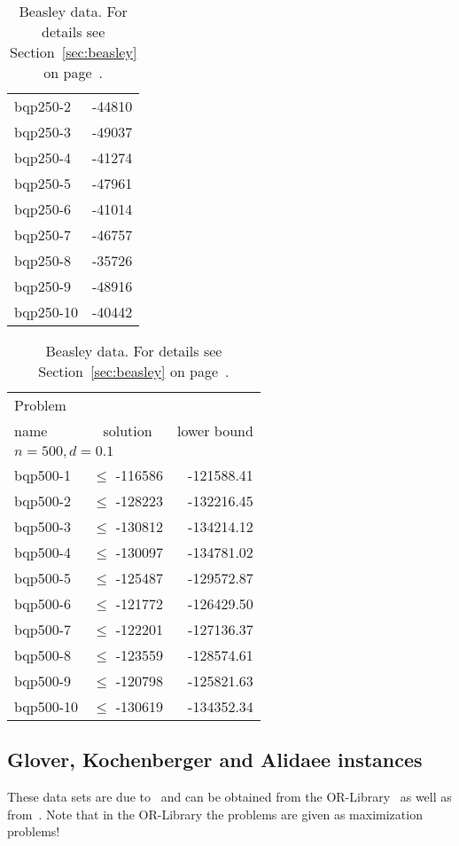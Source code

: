 \documentclass[a4paper, 12pt]{article}
\begin{document}
\begin{table}
\begin{center}
\begin{minipage}{38ex}
\begin{center}
\begin{tabular}{|l|r|}
bqp250-2  & -44810  \\
bqp250-3  & -49037  \\
bqp250-4  & -41274  \\
bqp250-5  & -47961  \\
bqp250-6  & -41014  \\
bqp250-7  & -46757  \\
bqp250-8  & -35726  \\
bqp250-9  & -48916  \\
bqp250-10 & -40442  \\
\hline
\end{tabular}
\end{center}

\begin{tabular}{|l|r|r|}
\hline
Problem& & \\
name &\multicolumn{1}{|c|}{solution}&\multicolumn{1}{|c|}{lower bound}\\
\hline
\multicolumn{3}{|l|}{$n=500, d=0.1$}\\
\hline
bqp500-1  & $\le$ -116586 & -121588.41 \\
bqp500-2  & $\le$ -128223 & -132216.45 \\
bqp500-3  & $\le$ -130812 & -134214.12 \\
bqp500-4  & $\le$ -130097 & -134781.02 \\
bqp500-5  & $\le$ -125487 & -129572.87 \\
bqp500-6  & $\le$ -121772 & -126429.50 \\
bqp500-7  & $\le$ -122201 & -127136.37 \\
bqp500-8  & $\le$ -123559 & -128574.61 \\
bqp500-9  & $\le$ -120798 & -125821.63 \\
bqp500-10 & $\le$ -130619 & -134352.34 \\
\hline
\end{tabular}
\end{minipage}
\caption{Beasley data. For details see Section~\ref{sec:beasley} on
  page~\pageref{sec:beasley}.} \label{tab:beasley} 
\end{center} 
\end{table}



\subsection{Glover, Kochenberger and Alidaee instances} \label{sec:gka}
These data sets are due to~\cite{GlKoAl:98} and can be obtained from the
OR-Library~\cite{Be:90b} as well as from~\cite{Wi:07}. Note that in the
OR-Library the problems are given as maximization problems!
\end{document}
